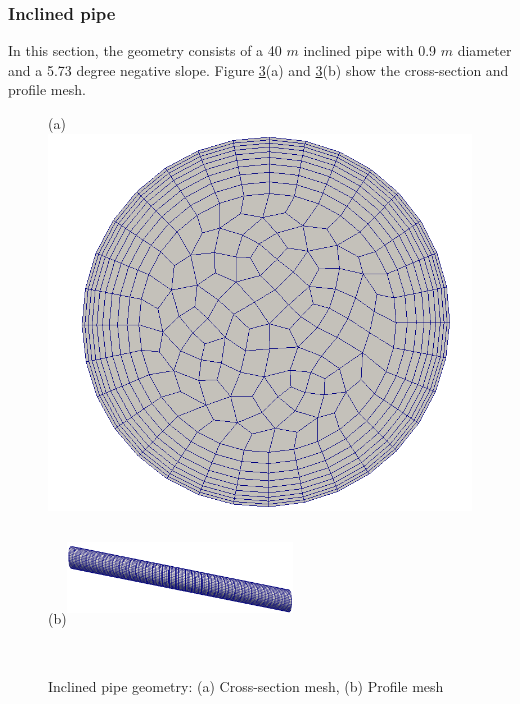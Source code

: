 \documentclass[review,3p,times,12pt]{elsarticle}
\begin{document}
\subsubsection{Inclined pipe}\label{inclined}
 In this section, the geometry consists of a 40 $m$ inclined pipe with 0.9 $m$ diameter and a 5.73 degree negative slope. Figure \ref{incline}(a) and \ref{incline}(b) show the
 cross-section and profile mesh.\\
\begin{minipage}[t]{0.35\textwidth}
\begin{figure}[H]
\begin{center}
(a)\includegraphics[scale =0.09]{section.png}
    \label{fig:gauss}
    \end{center}
\end{figure}
\end{minipage}\hfill
 \begin{minipage}[t]{0.4\textwidth}
\begin{figure}[H]
(b)\includegraphics[width=6cm,height=2.5cm]{IP}
    \label{fig:gauss}
\end{figure}
\end{minipage}\\
\begin{figure}[H]
    \centering
    \caption{Inclined pipe geometry: (a) Cross-section mesh, (b) Profile mesh }
    \label{incline}
\end{figure}
\end{document}
